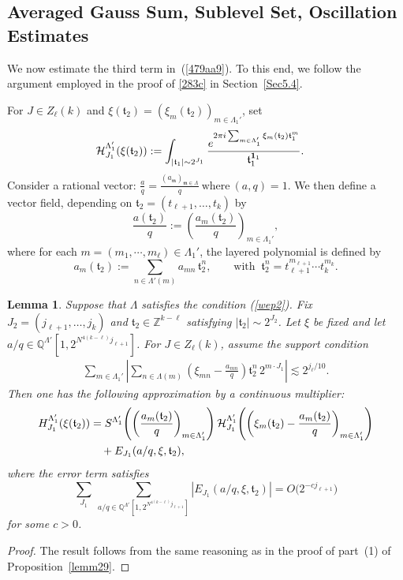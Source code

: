\documentclass[11 pt,letterpaper]{amsart}
\theoremstyle{plain}
\newtheorem{lemma}{Lemma}\numberwithin{lemma}{section}
\theoremstyle{definition}
\theoremstyle{remark} \theoremstyle{exam} \theoremstyle{ob}
\numberwithin{equation}{section}
\begin{document}
\subsection{Averaged Gauss Sum, Sublevel Set, Oscillation Estimates}\label{5.3}
We now estimate the third term in~(\ref{479aa9}). To this end, we follow the argument employed in the proof of \eqref{283c} in Section~\ref{Sec5.4}.


 For $J\in Z_{\ell}(k)$ and $\xi(\mathfrak{t}_2)=(\xi_{m}(\mathfrak{t}_2))_{m\in \Lambda_1'}$,  set
	\begin{align*} 
		\mathcal{H}_{J_1}^{\Lambda'_1}(\xi(\mathfrak{t}_2) ) &:=\int_{|\mathfrak{t}_1|\sim 2^{J_1}} \frac{e^{2\pi i \sum_{m\in \Lambda'_1} \xi_{m}(\mathfrak{t}_2)\mathfrak{t}_1^{m}} }{\mathfrak{t}_1^{{\bf 1}_1}}.
	\end{align*} 
	Consider a rational vector: 
	$
	\frac{a}{q}=\frac{(a_{\mathfrak{m}})_{\mathfrak{m}\in \Lambda}}{q}  \ \text{where}  \ (a,q)=1.$ We then
	define a vector field, depending on $\mathfrak{t}_2=(t_{\ell+1},\dots,t_k)$ by
	\[
	\frac{a(\mathfrak{t}_2)}{q}:=\left( \frac{a_{m}(\mathfrak{t}_2)}{q} \right)_{m\in \Lambda_{1}'},
	\]
	where   for each $m=(m_1,\cdots,m_{\ell})\in \Lambda_1'$,  the layered polynomial is defined by
	\[
	a_{m}(\mathfrak{t}_2):=\sum_{n \in \Lambda'(m)} a_{mn}\,\mathfrak{t}_2^{n}, 
	\qquad \text{with } \ \mathfrak{t}_2^n=t_{\ell+1}^{m_{\ell+1}}\cdots t_k^{m_k}.
	\]
	
	\begin{lemma}\label{kw999}
Suppose that $\Lambda$ satisfies   the  condition (\ref{wep2}).  Fix $J_2=(j_{\ell+1},\ldots,j_k)$ and
$\mathfrak{t}_2\in\mathbb{Z}^{k-\ell}$ satisfying
$|\mathfrak{t}_2|\sim2^{J_2}$.
Let $\xi$ be fixed and let $a/q \in \mathbb{Q}^{\Lambda'}\!\left[1,2^{N^{4(k-\ell)} j_{\ell+1}}\right]$. 
For $J\in Z_{\ell}(k)$, assume the support condition
\begin{align}\label{um199}
\sum_{m\in \Lambda_1'}\left| 
\sum_{n\in\Lambda(m)}
\left( \xi_{mn}-\frac{a_{mn}}{q} \right)\mathfrak{t}_2^n \, 2^{m\cdot J_1} 
\right|
\lesssim 2^{j_{\ell}/10}.
\end{align}
Then one has the following approximation by a continuous multiplier:
\begin{align}\label{um1990}
H^{\Lambda'_{1}}_{J_1}( \xi(\mathfrak{t}_2) )
&=  S^{\Lambda'_{1}}\!\left( \left( \frac{a_{m}(\mathfrak{t}_2)}{q}\right)_{m\in \Lambda'_{1}}\right)  
\mathcal{H}^{\Lambda'_{1}}_{J_1}\!\left(\left(\xi_{m}(\mathfrak{t}_2)-\frac{a_{m}(\mathfrak{t}_2)}{q}\right)_{m\in \Lambda'_{1}}\right) \notag \\
&\quad + E_{J_1}(a/q,\xi,\mathfrak{t}_2),
\end{align}
where the error term satisfies
\[
\sum_{J_1} \ \sum_{a/q \in \mathbb{Q}^{\Lambda'}[1,2^{N^{4(k-\ell)} j_{\ell+1}}]}  
|E_{J_1}(a/q,\xi,\mathfrak{t}_2)|
= O\bigl(2^{-c j_{\ell+1}}\bigr)
\]
for some $c>0$.
\end{lemma}
	 \begin{proof}
The  result follows from the same reasoning as in the proof of part~(1) of Proposition~\ref{lemm29}.
\end{proof}  
\end{document}
